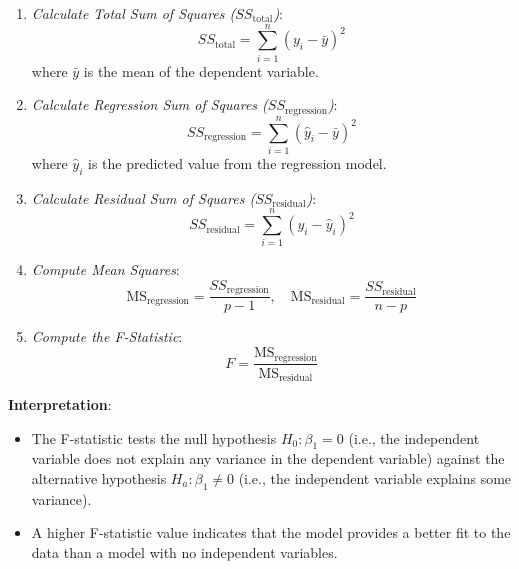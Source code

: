 \begin{enumerate}
    \item \textit{Calculate Total Sum of Squares (\(SS_{\text{total}}\))}:
    \[
    SS_{\text{total}} = \sum_{i=1}^{n}(y_i - \bar{y})^2
    \]
    where \(\bar{y}\) is the mean of the dependent variable.

    \item \textit{Calculate Regression Sum of Squares (\(SS_{\text{regression}}\))}:
    \[
    SS_{\text{regression}} = \sum_{i=1}^{n}(\hat{y}_i - \bar{y})^2
    \]
    where \(\hat{y}_i\) is the predicted value from the regression model.

    \item \textit{Calculate Residual Sum of Squares (\(SS_{\text{residual}}\))}:
    \[
    SS_{\text{residual}} = \sum_{i=1}^{n}(y_i - \hat{y}_i)^2
    \]

    \item \textit{Compute Mean Squares}:
    \[
    \text{MS}_{\text{regression}} = \frac{SS_{\text{regression}}}{p - 1}, \quad \text{MS}_{\text{residual}} = \frac{SS_{\text{residual}}}{n - p}
    \]

    \item \textit{Compute the F-Statistic}:
    \[
    F = \frac{\text{MS}_{\text{regression}}}{\text{MS}_{\text{residual}}}
    \]
\end{enumerate}

\textbf{Interpretation}:

\begin{itemize}
    \item The F-statistic tests the null hypothesis \(H_0: \beta_1 = 0\) (i.e., the independent variable does not explain any variance in the dependent variable) against the alternative hypothesis \(H_a: \beta_1 \neq 0\) (i.e., the independent variable explains some variance).
    \item A higher F-statistic value indicates that the model provides a better fit to the data than a model with no independent variables.
\end{itemize}

